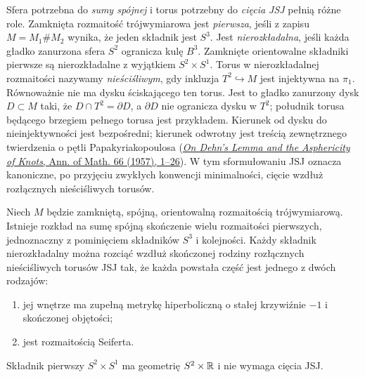 Sfera potrzebna do \emph{sumy spójnej} i torus potrzebny do
\emph{cięcia JSJ} pełnią różne role. Zamknięta rozmaitość trójwymiarowa
jest \emph{pierwsza}, jeśli z zapisu $M=M_1\#M_2$ wynika,
że jeden składnik jest $S^3$. Jest \emph{nierozkładalna},
jeśli każda gładko zanurzona sfera $S^2$ ogranicza kulę $B^3$.
Zamknięte orientowalne składniki pierwsze są nierozkładalne
z wyjątkiem $S^2\times S^1$. Torus w nierozkładalnej
rozmaitości nazywamy \emph{nieściśliwym}, gdy inkluzja
$T^2\hookrightarrow M$ jest injektywna na $\pi_1$.
Równoważnie nie ma dysku ściskającego ten torus.
Jest to gładko zanurzony dysk $D\subset M$ taki, że
$D\cap T^2=\partial D$, a $\partial D$ nie ogranicza dysku
w $T^2$; południk torusa będącego brzegiem pełnego torusa
jest przykładem.
Kierunek od dysku do nieinjektywności jest bezpośredni;
kierunek odwrotny jest treścią zewnętrznego twierdzenia
o pętli Papakyriakopoulosa
(\href{https://doi.org/10.2307/1970113}
{\emph{On Dehn's Lemma and the Asphericity of Knots},
Ann. of Math. 66 (1957), 1--26}).
W tym sformułowaniu JSJ oznacza kanoniczne, po przyjęciu
zwykłych konwencji minimalności, cięcie wzdłuż rozłącznych
nieściśliwych torusów.

\begin{twierdzenie}
\label{thm:thurston-geometrization}
Niech $M$ będzie zamkniętą, spójną, orientowalną
rozmaitością trójwymiarową. Istnieje rozkład na sumę spójną skończenie
wielu rozmaitości pierwszych, jednoznaczny z pominięciem
składników $S^3$ i kolejności. Każdy składnik
nierozkładalny można rozciąć wzdłuż skończonej rodziny
rozłącznych nieściśliwych torusów JSJ tak, że każda
powstała część jest jednego z dwóch rodzajów:
\begin{enumerate}[label=\textup{(\roman*)}]
\item jej wnętrze ma zupełną metrykę hiperboliczną
  o stałej krzywiźnie $-1$ i skończonej objętości;
\item jest rozmaitością Seiferta.
\end{enumerate}
Składnik pierwszy $S^2\times S^1$ ma geometrię
$S^2\times\mathbb{R}$ i nie wymaga cięcia JSJ.
\end{twierdzenie}

